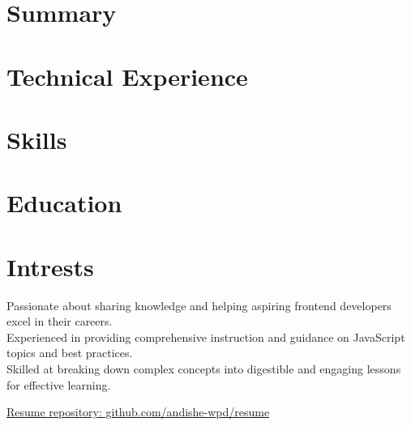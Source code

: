 \documentclass[letter,10pt]{article}
\begin{document}
\section{Summary}



\section{Technical Experience}


\section{Skills}


\section{Education}


\section{Intrests}
 Passionate about sharing knowledge and helping aspiring frontend developers excel in their careers.\\
Experienced in providing comprehensive instruction and guidance on JavaScript topics and best practices.\\
Skilled at breaking down complex concepts into digestible and engaging lessons for effective learning.


\hfill \href{https://github.com/andishe-wpd/resume}{ Resume repository: github.com/andishe-wpd/resume}
\end{document}
